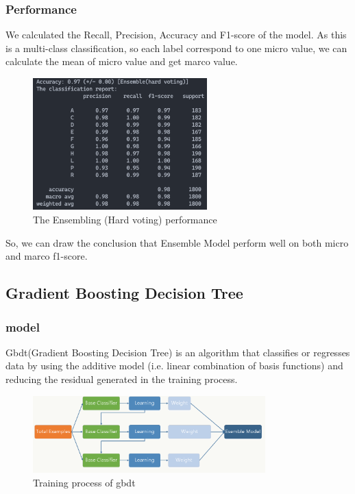 \documentclass[11pt,en,cite=authoryear]{elegantpaper}
\begin{document}
\subsubsection*{Performance}
We calculated the Recall, Precision, Accuracy and F1-score of the model. As this is a multi-class classification, so each label correspond to one micro value, we can calculate the mean of micro value and get marco value.
\begin{figure}[H]
	\centering
	\includegraphics[width=0.6\textwidth]{image/hvpf}
	\caption{The Ensembling (Hard voting) performance}
	\label{hvpf}
\end{figure}
So, we can draw the conclusion that Ensemble Model perform well on both micro and marco f1-score.

\subsection{Gradient Boosting Decision Tree}

\subsubsection{model}
Gbdt(Gradient Boosting Decision Tree) is an algorithm that classifies or regresses data by using the additive model (i.e. linear combination of basis functions) and reducing the residual generated in the training process.

\begin{figure}[H]
	\centering
	\includegraphics[width=0.8\textwidth]{image/gbdt_1}
	\caption{Training process of gbdt}
	\label{gbdt1}
\end{figure}
\end{document}
